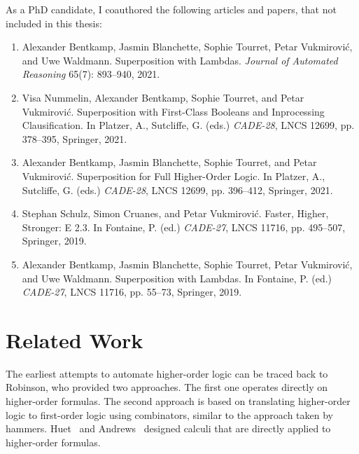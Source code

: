 As a PhD candidate, I coauthored the following articles and papers, that not included in this thesis:

\begin{enumerate}[resume]
  \item Alexander Bentkamp, Jasmin Blanchette, Sophie Tourret, Petar Vukmirović, and Uwe Waldmann.  Superposition with Lambdas.
  \emph{Journal of Automated Reasoning} 65(7): 893--940, 2021. 
  \item Visa Nummelin, Alexander Bentkamp, Sophie Tourret, and Petar Vukmirović. Superposition with First-Class Booleans and Inprocessing Clausification.
  In Platzer, A., Sutcliffe, G. (eds.) \emph{CADE-28}, LNCS 12699, pp. 378--395, Springer, 2021.
  \item Alexander Bentkamp, Jasmin Blanchette, Sophie Tourret, and Petar Vukmirović. Superposition for Full Higher-Order Logic.
  In Platzer, A., Sutcliffe, G. (eds.) \emph{CADE-28}, LNCS 12699, pp. 396--412, Springer, 2021.
  \item Stephan Schulz, Simon Cruanes, and Petar Vukmirović. Faster, Higher, Stronger: E 2.3.
  In Fontaine, P. (ed.) \emph{CADE-27},  LNCS 11716, pp. 495--507, Springer, 2019.
  \item Alexander Bentkamp, Jasmin Blanchette, Sophie Tourret, Petar Vukmirović, and Uwe Waldmann.  Superposition with Lambdas.
  In Fontaine, P. (ed.) \emph{CADE-27}, LNCS 11716, pp. 55--73, Springer, 2019. 
\end{enumerate}

\section{Related Work}

The earliest attempts to automate higher-order logic can be traced back to
Robinson, who provided two approaches. The first one \cite{ar-69-hol} operates
directly on higher-order formulas. The second approach \cite{ar-70-hol} is based
on translating higher-order logic to first-order logic using combinators,
similar to the approach taken by hammers. Huet~\cite{gh-73-hol} and
Andrews~\cite{pa-71-type-theory} designed calculi that are directly applied to
higher-order formulas.

